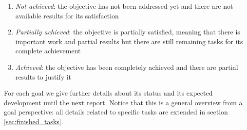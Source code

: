 \documentclass[11pt]{article}
\begin{document}
\begin{enumerate}
\item \textit{Not achieved}: the objective has not been addressed yet and there are not available results for its satisfaction
\item \textit{Partially achieved}: the objective is partially satisfied, meaning that there is important work and partial results but there are still remaining tasks for its complete achievement
\item \textit{Achieved}: the objective has been completely achieved and there are partial results to justify it
\end{enumerate}

For each goal we give further details about its status and its expected development until the next report. Notice that this is a general overview from a goal perspective: all details related to specific tasks are extended in section \ref{sec:finished_tasks}.
\end{document}
